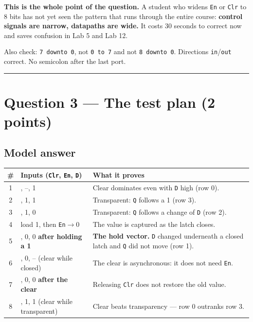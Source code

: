 \documentclass[11pt]{article}
\newcommand{\code}[1]{\texttt{#1}}
\newcommand{\hr}{\vspace{2pt}\hrule\vspace{6pt}}
\begin{document}
\textbf{This is the whole point of the question.} A student who widens \code{En}
or \code{Clr} to 8 bits has not yet seen the pattern that runs through the entire
course: \textbf{control signals are narrow, datapaths are wide.} It costs 30
seconds to correct now and saves confusion in Lab 5 and Lab 12.

Also check: \code{7 downto 0}, not \code{0 to 7} and not \code{8 downto 0}.
Directions \code{in}/\code{out} correct. No semicolon after the last port.

\vspace{4pt}\hr

\section*{Question 3 --- The test plan (2 points)}

\subsection*{Model answer}

\begin{center}
\small
\begin{tabular}{c>{\raggedright\arraybackslash}p{4.8cm}>{\raggedright\arraybackslash}p{8.0cm}}
\toprule
\# & Inputs (\code{Clr}, \code{En}, \code{D}) & What it proves \\
\midrule
1 & 1, --, 1 & Clear dominates even with \code{D} high (row 0). \\
2 & 0, 1, 1 & Transparent: \code{Q} follows a 1 (row 3). \\
3 & 0, 1, 0 & Transparent: \code{Q} follows a change of \code{D} (row 2). \\
4 & load 1, then \code{En}$\to$0 & The value is captured as the latch closes. \\
5 & 0, 0, 0 \textbf{after holding a 1} & \textbf{The hold vector.} \code{D} changed underneath a closed latch and \code{Q} did not move (row 1). \\
6 & 1, 0, -- (clear while closed) & The clear is asynchronous: it does not need \code{En}. \\
7 & 0, 0, 0 \textbf{after the clear} & Releasing \code{Clr} does not restore the old value. \\
8 & 1, 1, 1 (clear while transparent) & Clear beats transparency --- row 0 outranks row 3. \\
\bottomrule
\end{tabular}
\end{center}
\end{document}
